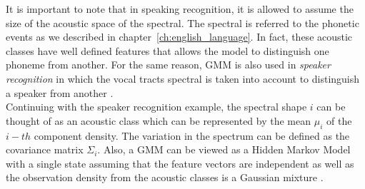 \begin{comment}
\begin{figure}[!ht]
	\centering
	\texttt{[image: Figures/gmm\_example.png]}
	\caption{Example of clustering using Gaussian Mixture Model}
	\label{fig:gmm_example}
\end{figure}
\end{comment}

\noindent It is important to note that in speaking recognition, it is allowed to assume the size of the acoustic space of the spectral. The spectral is referred to the phonetic events as we described in chapter~\ref{ch:english_language}. In fact, these acoustic classes have well defined features that allows the model to distinguish one phoneme from another. For the same reason, GMM is also used in \textit{speaker recognition} in which the vocal tracts spectral is taken into account to distinguish a speaker from another \cite{reynolds1992gaussian}. \\

\noindent Continuing with the speaker recognition example, the spectral shape $i$ can be thought of as an acoustic class which can be represented by the mean $\mu_{i}$ of the $i-th$ component density. The variation in the spectrum can be defined as the covariance matrix $\Sigma_{i}$. Also, a GMM can be viewed as a Hidden Markov Model with a single state assuming that the feature vectors are independent as well as the observation density from the acoustic classes is a Gaussian mixture \cite{reynolds2000speaker} \cite{reynolds1995robust}.
